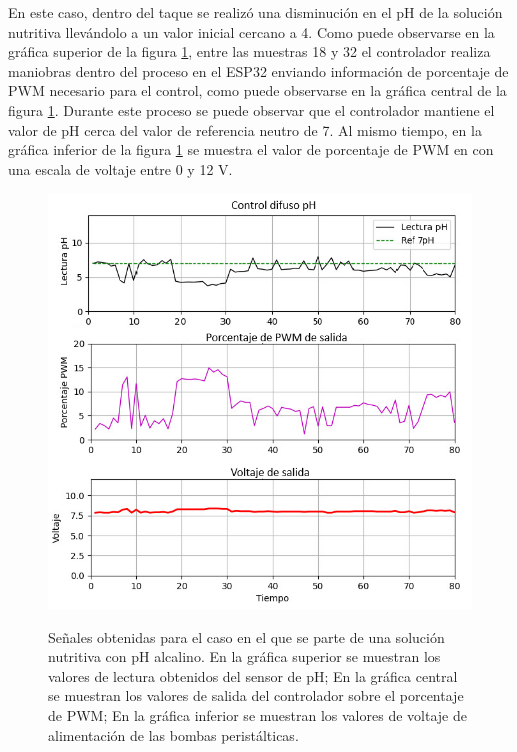 En este caso, dentro del taque se realizó una disminución en el pH de la solución nutritiva llevándolo a un valor inicial cercano a 4. Como puede observarse en la gráfica superior de la figura \ref{PHMenos}, entre las muestras 18 y 32 el controlador realiza maniobras dentro del proceso en el ESP32 enviando información de porcentaje de PWM necesario para el control, como puede observarse en la gráfica central de la figura \ref{PHMenos}. Durante este proceso se puede observar que el controlador mantiene el valor de pH cerca del valor de referencia neutro de 7. Al mismo tiempo, en la gráfica inferior de la figura \ref{PHMenos} se muestra el valor de porcentaje de PWM en con una escala de voltaje entre 0 y 12 V.
\begin{figure}[H]
\centering
         \includegraphics[scale=0.85]{imgs/phMenos.png} \\
    \caption{Señales obtenidas para el caso en el que se parte de una solución nutritiva con pH alcalino. En la gráfica superior se muestran los valores de lectura obtenidos del sensor de pH; En la gráfica central se muestran los valores de salida del controlador sobre el porcentaje de PWM; En la gráfica inferior se muestran los valores de voltaje de alimentación de las bombas peristálticas.}\label{PHMenos}
\end{figure}

\newpage
